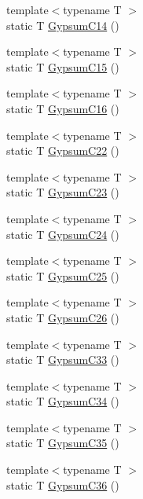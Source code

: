 \begin{DoxyCompactItemize}
\item 
{\footnotesize template$<$typename T $>$ }\\static T \mbox{\hyperlink{namespacempc_1_1data_a08ff2e149da17db5e2e7171b8ca684e5}{Gypsum\+C14}} ()
\item 
{\footnotesize template$<$typename T $>$ }\\static T \mbox{\hyperlink{namespacempc_1_1data_a7ddcd74539a8b32dd2f7030a4efd1f07}{Gypsum\+C15}} ()
\item 
{\footnotesize template$<$typename T $>$ }\\static T \mbox{\hyperlink{namespacempc_1_1data_a31a193f2ca43267dd16ce31fb10aed93}{Gypsum\+C16}} ()
\item 
{\footnotesize template$<$typename T $>$ }\\static T \mbox{\hyperlink{namespacempc_1_1data_a0978c31231459240af9baddc5a73b718}{Gypsum\+C22}} ()
\item 
{\footnotesize template$<$typename T $>$ }\\static T \mbox{\hyperlink{namespacempc_1_1data_a1050ed5720519e5be73b22fdba971dd2}{Gypsum\+C23}} ()
\item 
{\footnotesize template$<$typename T $>$ }\\static T \mbox{\hyperlink{namespacempc_1_1data_a417d2a6a150fd48d1aee5a8253493778}{Gypsum\+C24}} ()
\item 
{\footnotesize template$<$typename T $>$ }\\static T \mbox{\hyperlink{namespacempc_1_1data_a3dcfa64b5cccabe95b711fe6c8e1c7c6}{Gypsum\+C25}} ()
\item 
{\footnotesize template$<$typename T $>$ }\\static T \mbox{\hyperlink{namespacempc_1_1data_a8e907e810207c4d7475ecf96cd487828}{Gypsum\+C26}} ()
\item 
{\footnotesize template$<$typename T $>$ }\\static T \mbox{\hyperlink{namespacempc_1_1data_acb91c2cea9724bf28fe6708fca9dde78}{Gypsum\+C33}} ()
\item 
{\footnotesize template$<$typename T $>$ }\\static T \mbox{\hyperlink{namespacempc_1_1data_a8eadfdb2b7dc3da0be60b14eca00b9b4}{Gypsum\+C34}} ()
\item 
{\footnotesize template$<$typename T $>$ }\\static T \mbox{\hyperlink{namespacempc_1_1data_a0de1028e7b7e79d8384d10acf211cf19}{Gypsum\+C35}} ()
\item 
{\footnotesize template$<$typename T $>$ }\\static T \mbox{\hyperlink{namespacempc_1_1data_ae8689488432034a25c9db20f816c5416}{Gypsum\+C36}} ()

\end{DoxyCompactItemize}
